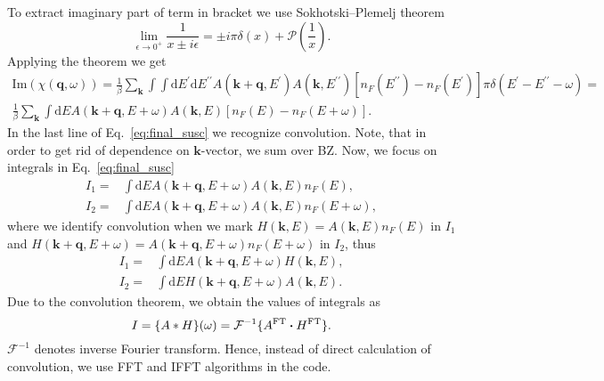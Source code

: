 \documentclass[preprint,prb,amsmath,superscriptaddress,showpacs]{revtex4}
\begin{document}
%
To extract imaginary part of term in bracket we use Sokhotski–Plemelj
theorem
%
\begin{equation}
\lim_{\epsilon \rightarrow 0^{+}} \frac{1}{x \pm i\epsilon} = \pm
i\pi\delta (x) + \mathcal{P}\left( \frac{1}{x} \right).
\end{equation}
%
Applying the theorem we get
%
\begin{equation}
    \begin{gathered}
 \mathrm{Im} (\chi(\mathbf{q}, \omega)) =  \frac{1}{\beta} \sum_{\mathbf{k}} \int \int
      \mathrm{d}E^{\prime} \mathrm{d}E^{\prime \prime} A(\mathbf{k} +
      \mathbf{q}, E^{\prime}) A(\mathbf{k}, E^{\prime \prime}) \left[
        n_F(E^{\prime \prime}) - n_F(E^{\prime}) \right] \pi
      \delta(E^{\prime} - E^{\prime \prime} - \omega) = \\
       \frac{1}{\beta} \sum_{\mathbf{k}} \int
      \mathrm{d}E A(\mathbf{k} +
      \mathbf{q}, E + \omega) A(\mathbf{k}, E) \left[
        n_F(E) - n_F(E + \omega) \right].
    \end{gathered}
    \label{eq:final_susc}
\end{equation}
%
In the last line of Eq.~\eqref{eq:final_susc} we recognize convolution. Note, that in order to get rid of dependence on $\mathbf{k}$-vector,
we sum over BZ. Now, we focus on integrals in Eq.~\eqref{eq:final_susc}
%
\begin{align*}
I_1 =& \int  \mathrm{d}E A(\mathbf{k} +
       \mathbf{q}, E + \omega) A(\mathbf{k}, E) n_F(E), \\
I_2 =& \int  \mathrm{d}E A(\mathbf{k} +
       \mathbf{q}, E + \omega) A(\mathbf{k}, E) n_F(E+\omega),
\end{align*}
%
where we identify convolution when we mark $H(\mathbf{k}, E) =
A(\mathbf{k}, E) n_F(E)$ in $I_1$ and $H(\mathbf{k}+\mathbf{q}, E+\omega) =
A(\mathbf{k} + \mathbf{q}, E + \omega) n_F(E+\omega)$ in $I_2$, thus
%
\begin{align*}
I_1 =& \int  \mathrm{d}E A(\mathbf{k} +
       \mathbf{q}, E + \omega) H(\mathbf{k}, E), \\
I_2 =& \int  \mathrm{d}E H(\mathbf{k} +
       \mathbf{q}, E + \omega) A(\mathbf{k}, E).
\end{align*}
%
Due to the convolution theorem, we obtain the values of integrals as
%
\begin{equation}
I = \{ A * H \}(\omega) = \mathcal{F}^{-1} \{ A^{\mathrm{FT}}
\dotproduct H^{\mathrm{FT}} \}.
\end{equation}
%
$\mathcal{F}^{-1}$ denotes inverse Fourier transform. Hence, instead of direct
calculation of convolution, we use FFT and IFFT algorithms in the
code.
\end{document}
